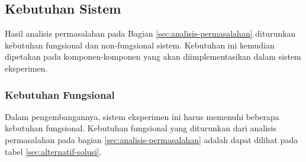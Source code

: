 \subsection{Kebutuhan Sistem}
\label{subsection:system-requirements}

Hasil analisis permasalahan pada Bagian \ref{sec:analisis-permasalahan} diturunkan kebutuhan fungsional dan non-fungsional sistem. Kebutuhan ini kemudian dipetakan pada komponen-komponen yang akan diimplementasikan dalam sistem eksperimen.

\subsubsection{Kebutuhan Fungsional}
\label{subsection:functional-requirements}

Dalam pengembangannya, sistem eksperimen ini harus memenuhi beberapa kebutuhan fungsional. Kebutuhan fungsional yang diturunkan dari analisis permasalahan pada bagian \ref{sec:analisis-permasalahan} adalah dapat dilihat pada tabel \ref{sec:alternatif-solusi}.

